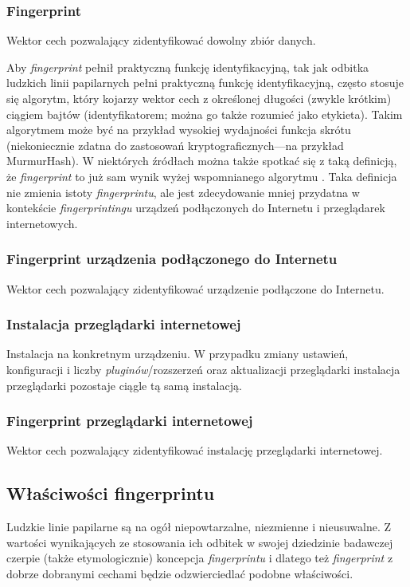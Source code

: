 \subsubsection{Fingerprint}
Wektor cech pozwalający zidentyfikować dowolny zbiór danych.

Aby \emph{fingerprint} pełnił praktyczną funkcję identyfikacyjną, tak jak
odbitka ludzkich linii papilarnych pełni praktyczną funkcję identyfikacyjną,
często stosuje się algorytm, który kojarzy wektor cech z określonej długości
(zwykle krótkim) ciągiem bajtów (identyfikatorem; można go także rozumieć jako
etykieta). Takim algorytmem może być na przykład wysokiej wydajności funkcja
skrótu (niekoniecznie zdatna do zastosowań kryptograficznych---na przykład
MurmurHash). W niektórych źródłach można także spotkać się z taką definicją, że
\emph{fingerprint} to już sam wynik wyżej wspomnianego algorytmu \cite[s.
123--132]{wu2018beauty}. Taka definicja nie zmienia istoty \emph{fingerprintu},
ale jest zdecydowanie mniej przydatna w kontekście \emph{fingerprintingu}
urządzeń podłączonych do Internetu i przeglądarek internetowych.

\subsubsection{Fingerprint urządzenia podłączonego do Internetu}
Wektor cech pozwalający zidentyfikować urządzenie podłączone do Internetu.

\subsubsection{Instalacja przeglądarki internetowej}
Instalacja na konkretnym urządzeniu. W przypadku zmiany ustawień, konfiguracji i
liczby \emph{pluginów}/rozszerzeń oraz aktualizacji przeglądarki instalacja
przeglądarki pozostaje ciągle tą samą instalacją.

\subsubsection{Fingerprint przeglądarki internetowej}
Wektor cech pozwalający zidentyfikować instalację przeglądarki internetowej.

\subsection{Właściwości fingerprintu}
Ludzkie linie papilarne są na ogół niepowtarzalne, niezmienne i nieusuwalne. Z
wartości wynikających ze stosowania ich odbitek w swojej dziedzinie badawczej
czerpie (także etymologicznie) koncepcja \emph{fingerprintu} i dlatego też
\emph{fingerprint} z dobrze dobranymi cechami będzie odzwierciedlać podobne
właściwości.

